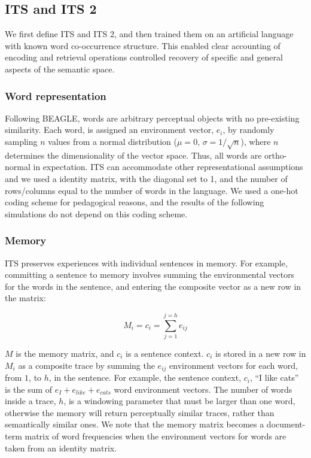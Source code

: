 \documentclass[10pt,letterpaper]{article}
\begin{document}
\subsection{ITS and ITS 2}

We first define ITS and ITS 2, and then trained them on an artificial language with known word co-occurrence structure. This enabled clear accounting of encoding and retrieval operations controlled recovery of specific and general aspects of the semantic space.

\subsubsection{Word representation}

Following BEAGLE, words are arbitrary perceptual objects with no pre-existing similarity. Each word, is assigned an environment vector, $e_i$, by randomly sampling \(n\) values from a normal distribution (\(\mu = 0\), \(\sigma = 1/\sqrt{n}\)), where \(n\) determines the dimensionality of the vector space. Thus, all words are ortho-normal in expectation. ITS can accommodate other representational assumptions and we used a identity matrix, with the diagonal set to 1, and the number of rows/columns equal to the number of words in the language. We used a one-hot coding scheme for pedagogical reasons, and the results of the following simulations do not depend on this coding scheme.

\subsubsection{Memory}

ITS preserves experiences with individual sentences in memory. For example, committing a sentence to memory involves summing the environmental vectors for the words in the sentence, and entering the composite vector as a new row in the matrix:

\begin{equation}
M_i = c_i = \sum_{j=1}^{j=h} e_{ij}
\label{eq:memory}
\end{equation}

\noindent \(M\) is the memory matrix, and \(c_i\) is a sentence context. \(c_i\) is stored in a new row in \(M_i\) as a composite trace by summing the \(e_{ij}\) environment vectors for each word, from \(1\), to \(h\), in the sentence. For example, the sentence context, $c_i$, ``I like cats'' is the sum of \(e_{I} + e_{like} + e_{cats}\) word environment vectors. The number of words inside a trace, $h$, is a windowing parameter that must be larger than one word, otherwise the memory will return perceptually similar traces, rather than semantically similar ones. We note that the memory matrix becomes a document-term matrix of word frequencies when the environment vectors for words are taken from an identity matrix.
\end{document}

